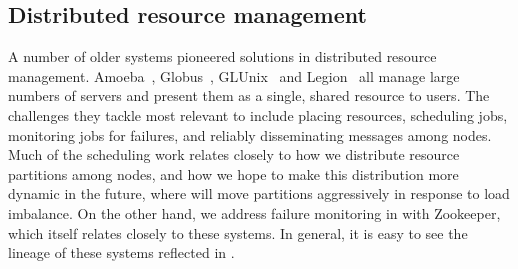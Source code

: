 \subsection{Distributed resource management}
%
A number of older systems pioneered solutions in distributed resource
management.  Amoeba~\cite{tanenbaum90}, Globus~\cite{frey02}, GLUnix~\cite{ghormley98} and 
Legion~\cite{chapin99} all manage large numbers of
servers and present them as a single, shared resource to users.  The challenges
they tackle most relevant to \helix include placing resources, scheduling jobs, monitoring 
jobs for failures, and reliably disseminating messages among nodes.  Much of the
scheduling work relates closely to how we distribute resource partitions among
nodes, and how we hope to make this distribution more dynamic in the future,
where \helix will move partitions aggressively in response to load imbalance.
On the other hand, we address failure monitoring in \helix with Zookeeper,
which itself relates closely to these systems.  In general, it is easy to see
the lineage of these systems reflected in \helix.
